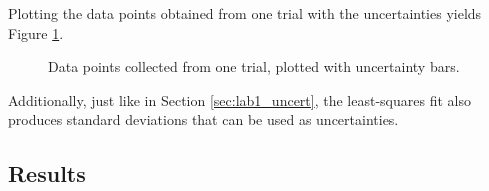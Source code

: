 \documentclass[aps,twocolumn,secnumarabic,nobalancelastpage,amsmath,amssymb,nofootinbib,floatfix,letterpaper]{revtex4}
\begin{document}
Plotting the data points obtained from one trial with the uncertainties yields Figure \ref{fig:lab2_data1}.

\begin{figure}[htb]
    \caption{Data points collected from one trial, plotted with uncertainty bars.}
    \label{fig:lab2_data1}
\end{figure}

Additionally, just like in Section \ref{sec:lab1_uncert}, the least-squares fit also produces standard deviations that
can be used as uncertainties.

\subsection{Results}
\end{document}
